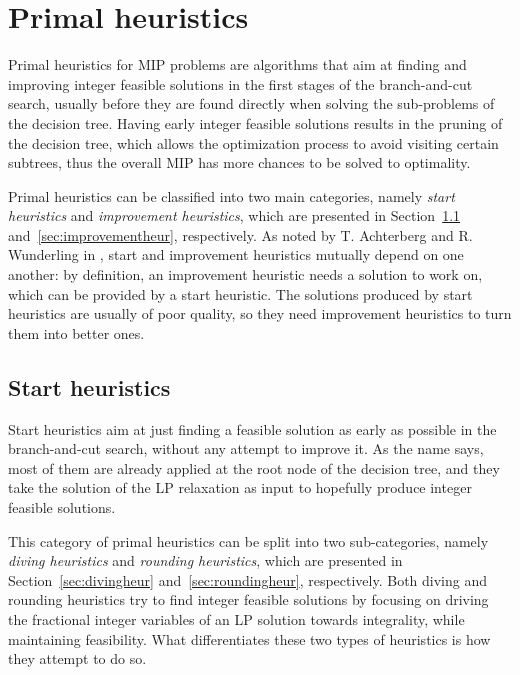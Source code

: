 \documentclass[a4paper,12pt,twoside]{scrbook}
\begin{document}
\chapter{Primal heuristics}
Primal heuristics for MIP problems are algorithms that aim at finding and improving integer feasible solutions in the first stages of the branch-and-cut search, usually before they are found directly when solving the sub-problems of the decision tree. Having early integer feasible solutions results in the pruning of the decision tree, which allows the optimization process to avoid visiting certain subtrees, thus the overall MIP has more chances to be solved to optimality. \par 
Primal heuristics can be classified into two main categories, namely \textit{start heuristics} and \textit{improvement heuristics}, which are presented in Section~\ref{sec:startheur} and~\ref{sec:improvementheur}, respectively. As noted by T. Achterberg and R. Wunderling in \cite{achterberg2013}, start and improvement heuristics mutually depend on one another: by definition, an improvement heuristic needs a solution to work on, which can be provided by a start heuristic. The solutions produced by start heuristics are usually of poor quality, so they need improvement heuristics to turn them into better ones.

\section{Start heuristics} \label{sec:startheur}
Start heuristics aim at just finding a feasible solution as early as possible in the branch-and-cut search, without any attempt to improve it. As the name says, most of them are already applied at the root node of the decision tree, and they take the solution of the LP relaxation as input to hopefully produce integer feasible solutions. \par 
This category of primal heuristics can be split into two sub-categories, namely \textit{diving heuristics} and \textit{rounding heuristics}, which are presented in Section~\ref{sec:divingheur} and~\ref{sec:roundingheur}, respectively. Both diving and rounding heuristics try to find integer feasible solutions by focusing on driving the fractional integer variables of an LP solution towards integrality, while maintaining feasibility. What differentiates these two types of heuristics is how they attempt to do so.
\end{document}
